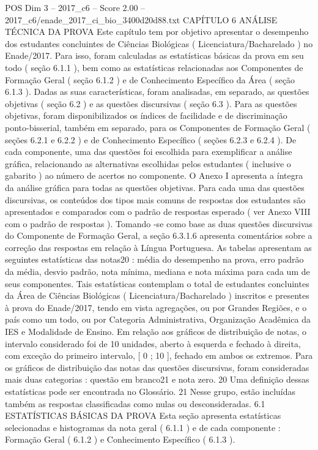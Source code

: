 \begin{textsample}{POS Dim 3 – 2017\_c6 – Score 2.00 – 2017\_c6/enade\_2017\_ci\_bio\_3400d20d88.txt}  \label{ex:f3_pos_192}
CAPÍTULO 6 ANÁLISE TÉCNICA DA PROVA Este capítulo tem por objetivo apresentar o desempenho dos estudantes concluintes de Ciências Biológicas ( Licenciatura/Bacharelado ) no Enade/2017.
Para isso, foram calculadas as estatísticas básicas da prova em seu todo ( seção 6.1.1 ), bem como as estatísticas relacionadas aos Componentes de Formação Geral ( seção 6.1.2 ) e de Conhecimento Específico da Área ( seção 6.1.3 ).
Dadas as suas características, foram analisadas, em separado, as questões objetivas ( seção 6.2 ) e as questões discursivas ( seção 6.3 ).
Para as questões objetivas, foram disponibilizados os índices de facilidade e de discriminação ponto-bisserial, também em separado, para os Componentes de Formação Geral ( seções 6.2.1 e 6.2.2 ) e de Conhecimento Específico ( seções 6.2.3 e 6.2.4 ).
De cada componente, uma das questões foi escolhida para exemplificar a análise gráfica, relacionando as alternativas escolhidas pelos estudantes ( inclusive o gabarito ) ao número de acertos no componente.
O Anexo I apresenta a íntegra da análise gráfica para todas as questões objetivas.
Para cada uma das questões discursivas, os conteúdos dos tipos mais comuns de respostas dos estudantes são apresentados e comparados com o padrão de respostas esperado ( ver Anexo VIII com o padrão de respostas ).
Tomando -se como base as duas questões discursivas do Componente de Formação Geral, a seção 6.3.1.6 apresenta comentários sobre a correção das respostas em relação à Língua Portuguesa.
As tabelas apresentam as seguintes estatísticas das notas20 : média do desempenho na prova, erro padrão da média, desvio padrão, nota mínima, mediana e nota máxima para cada um de seus componentes.
Tais estatísticas contemplam o total de estudantes concluintes da Área de Ciências Biológicas ( Licenciatura/Bacharelado ) inscritos e presentes à prova do Enade/2017, tendo em vista agregações, ou por Grandes Regiões, e o país como um todo, ou por Categoria Administrativa, Organização Acadêmica da IES e Modalidade de Ensino.
Em relação aos gráficos de distribuição de notas, o intervalo considerado foi de 10 unidades, aberto à esquerda e fechado à direita, com exceção do primeiro intervalo, [ 0 ; 10 ], fechado em ambos os extremos.
Para os gráficos de distribuição das notas das questões discursivas, foram consideradas mais duas categorias : questão em branco21 e nota zero. 20 Uma definição dessas estatísticas pode ser encontrada no Glossário. 21 Nesse grupo, estão incluídas também as respostas classificadas como nulas ou desconsideradas. 6.1 ESTATÍSTICAS BÁSICAS DA PROVA Esta seção apresenta estatísticas selecionadas e histogramas da nota geral ( 6.1.1 ) e de cada componente : Formação Geral ( 6.1.2 ) e Conhecimento Específico ( 6.1.3 ).

\end{textsample}
